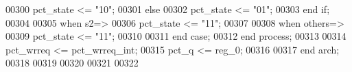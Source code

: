 \begin{DoxyCode}
00300                \textcolor{vhdlchar}{pct_state} \textcolor{vhdlchar}{<=} \textcolor{vhdllogic}{"10"};
00301                 \textcolor{keywordflow}{else}
00302                \textcolor{vhdlchar}{pct_state} \textcolor{vhdlchar}{<=} \textcolor{vhdllogic}{"01"};
00303                 \textcolor{keywordflow}{end} \textcolor{keywordflow}{if};
00304             
00305             \textcolor{keywordflow}{when} \textcolor{vhdlchar}{s2}\textcolor{vhdlchar}{=}\textcolor{vhdlchar}{>}
00306             \textcolor{vhdlchar}{pct_state} \textcolor{vhdlchar}{<=} \textcolor{vhdllogic}{"11"};
00307             
00308          \textcolor{keywordflow}{when} \textcolor{keywordflow}{others}\textcolor{vhdlchar}{=}\textcolor{vhdlchar}{>} 
00309             \textcolor{vhdlchar}{pct_state} \textcolor{vhdlchar}{<=} \textcolor{vhdllogic}{"11"};
00310             
00311         \textcolor{keywordflow}{end} \textcolor{keywordflow}{case};
00312     \textcolor{keywordflow}{end} \textcolor{keywordflow}{process};
00313    
00314 \textcolor{vhdlchar}{pct_wrreq}   \textcolor{vhdlchar}{<=} \textcolor{vhdlchar}{pct_wrreq_int};
00315 \textcolor{vhdlchar}{pct_q}       \textcolor{vhdlchar}{<=} \textcolor{vhdlchar}{reg_0};
00316   
00317 \textcolor{keywordflow}{end} \textcolor{vhdlchar}{arch};   
00318 
00319 
00320 
00321 
00322 
\end{DoxyCode}
